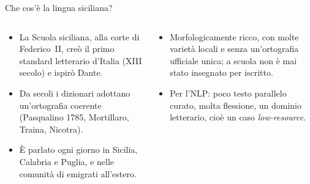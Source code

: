 \documentclass[aspectratio=169]{beamer}
\newcommand{\T}[2]{#2}
\newcommand{\T}[2]{#1}
\begin{document}
\begin{frame}{\T{What is the Sicilian language?}{Che cos'\`e la lingua siciliana?}}
  \begin{columns}[t]
    \begin{column}{0.56\textwidth}
      \begin{itemize}
        \item \T{The Sicilian School of poets at the court of Frederick~II created the first
              literary standard in Italy (13\textsuperscript{th} century), and inspired Dante.}%
              {La Scuola siciliana, alla corte di Federico~II, cre\`o il primo standard
              letterario d'Italia (XIII secolo) e ispir\`o Dante.}
        \item \T{Dictionaries have presented a consistent orthography for several hundred
              years (Pasqualino 1785, Mortillaro, Traina, Nicotra).}%
              {Da secoli i dizionari adottano un'ortografia coerente (Pasqualino 1785,
              Mortillaro, Traina, Nicotra).}
        \item \T{It is spoken daily in Sicily, Calabria and Puglia, and in diaspora communities
              abroad.}%
              {\`E parlato ogni giorno in Sicilia, Calabria e Puglia, e nelle comunit\`a di emigrati all'estero.}
      \end{itemize}
    \end{column}
    \begin{column}{0.44\textwidth}
      \begin{itemize}
        \item \T{Morphologically rich, with many local varieties and no single official
              orthography; schools never taught it in writing.}%
              {Morfologicamente ricco, con molte variet\`a locali e senza un'ortografia
              ufficiale unica; a scuola non \`e mai stato insegnato per iscritto.}
        \item \T{For NLP: little curated parallel text, much inflection, a literary domain,
              i.e., a low-resource setting.}%
              {Per l'NLP: poco testo parallelo curato, molta flessione, un dominio letterario,
              cio\`e un caso \emph{low-resource}.}
      \end{itemize}
    \end{column}
  \end{columns}
\end{frame}
\end{document}
